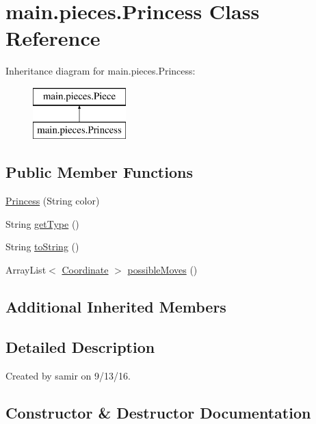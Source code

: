 \hypertarget{classmain_1_1pieces_1_1_princess}{}\section{main.\+pieces.\+Princess Class Reference}
\label{classmain_1_1pieces_1_1_princess}
Inheritance diagram for main.\+pieces.\+Princess\+:\begin{figure}[H]
\begin{center}
\leavevmode
\includegraphics[height=2.000000cm]{classmain_1_1pieces_1_1_princess}
\end{center}
\end{figure}
\subsection*{Public Member Functions}
\begin{DoxyCompactItemize}
\item 
\hyperlink{classmain_1_1pieces_1_1_princess_a971505387339fcf55d55296b0f479cc3}{Princess} (String color)
\item 
String \hyperlink{classmain_1_1pieces_1_1_princess_a63a4459d73ae413757873769a0a66691}{get\+Type} ()
\item 
String \hyperlink{classmain_1_1pieces_1_1_princess_a8be1df155dee4a3fbcc4ae1eebea0ff4}{to\+String} ()
\item 
Array\+List$<$ \hyperlink{classmain_1_1model_1_1_coordinate}{Coordinate} $>$ \hyperlink{classmain_1_1pieces_1_1_princess_a77559cdb19a3fdd60237bddef0420b44}{possible\+Moves} ()
\end{DoxyCompactItemize}
\subsection*{Additional Inherited Members}


\subsection{Detailed Description}
Created by samir on 9/13/16. 

\subsection{Constructor \& Destructor Documentation}
\hypertarget{classmain_1_1pieces_1_1_princess_a971505387339fcf55d55296b0f479cc3}{}\label{classmain_1_1pieces_1_1_princess_a971505387339fcf55d55296b0f479cc3} 
